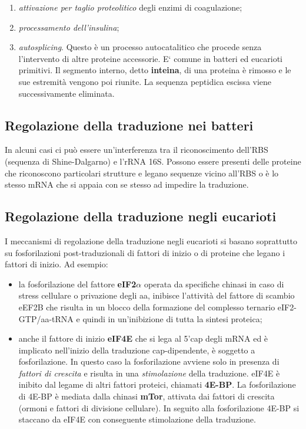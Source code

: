 \documentclass[11pt]{book}
\begin{document}
\begin{itemize}
  \begin{enumerate}
  \def\labelenumi{\arabic{enumi}.}
  \itemsep1pt\parskip0pt
  \item
    \emph{attivazione per taglio proteolitico} degli enzimi di
    coagulazione;
  \item
    \emph{processamento dell'insulina};
  \item
    \emph{autosplicing}. Questo è un processo autocatalitico che procede
    senza l'intervento di altre proteine accessorie. E` comune in
    batteri ed eucarioti primitivi. Il segmento interno, detto
    \textbf{inteina}, di una proteina è rimosso e le sue estremità
    vengono poi riunite. La sequenza peptidica escissa viene
    successivamente eliminata.
  \end{enumerate}
\end{itemize}

\subsection{Regolazione della traduzione nei
batteri}\label{regolazione-della-traduzione-nei-batteri}

In alcuni casi ci può essere un'interferenza tra il riconoscimento
dell'RBS (sequenza di Shine-Dalgarno) e l'rRNA 16S. Possono essere
presenti delle proteine che riconoscono particolari strutture e legano
sequenze vicino all'RBS o è lo stesso mRNA che si appaia con se stesso
ad impedire la traduzione.

\subsection{Regolazione della traduzione negli
eucarioti}\label{regolazione-della-traduzione-negli-eucarioti}

I meccanismi di regolazione della traduzione negli eucarioti si basano
soprattutto su fosforilazioni post-traduzionali di fattori di inizio o
di proteine che legano i fattori di inizio. Ad esempio:

\begin{itemize}
\itemsep1pt\parskip0pt
\item
  la fosforilazione del fattore \textbf{eIF2\(\alpha\)} operata da
  specifiche chinasi in caso di stress cellulare o privazione degli aa,
  inibisce l'attività del fattore di scambio eEF2B che risulta in un
  blocco della formazione del complesso ternario eIF2-GTP/aa-tRNA e
  quindi in un'inibizione di tutta la sintesi proteica;
\item
  anche il fattore di inizio \textbf{eIF4E} che si lega al 5'cap degli
  mRNA ed è implicato nell'inizio della traduzione cap-dipendente, è
  soggetto a fosforilazione. In questo caso la fosforilazione avviene
  solo in presenza di \emph{fattori di crescita} e risulta in una
  \emph{stimolazione} della traduzione. eIF4E è inibito dal legame di
  altri fattori proteici, chiamati \textbf{4E-BP}. La fosforilazione di
  4E-BP è mediata dalla chinasi \textbf{mTor}, attivata dai fattori di
  crescita (ormoni e fattori di divisione cellulare). In seguito alla
  fosforilazione 4E-BP si staccano da eIF4E con conseguente stimolazione
  della traduzione.
\end{itemize}
\end{document}
